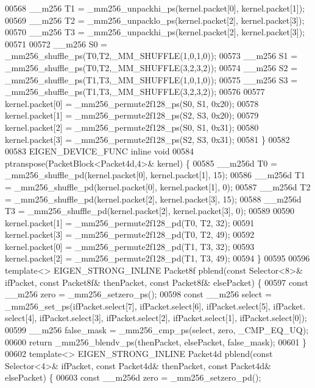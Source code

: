 \begin{DoxyCode}
{{00568   \_\_m256 T1 = \_mm256\_unpackhi\_ps(kernel.packet[0], kernel.packet[1]);
00569   \_\_m256 T2 = \_mm256\_unpacklo\_ps(kernel.packet[2], kernel.packet[3]);
00570   \_\_m256 T3 = \_mm256\_unpackhi\_ps(kernel.packet[2], kernel.packet[3]);
00571 
00572   \_\_m256 S0 = \_mm256\_shuffle\_ps(T0,T2,\_MM\_SHUFFLE(1,0,1,0));
00573   \_\_m256 S1 = \_mm256\_shuffle\_ps(T0,T2,\_MM\_SHUFFLE(3,2,3,2));
00574   \_\_m256 S2 = \_mm256\_shuffle\_ps(T1,T3,\_MM\_SHUFFLE(1,0,1,0));
00575   \_\_m256 S3 = \_mm256\_shuffle\_ps(T1,T3,\_MM\_SHUFFLE(3,2,3,2));
00576 
00577   kernel.packet[0] = \_mm256\_permute2f128\_ps(S0, S1, 0x20);
00578   kernel.packet[1] = \_mm256\_permute2f128\_ps(S2, S3, 0x20);
00579   kernel.packet[2] = \_mm256\_permute2f128\_ps(S0, S1, 0x31);
00580   kernel.packet[3] = \_mm256\_permute2f128\_ps(S2, S3, 0x31);
00581 \}
00582 
00583 EIGEN\_DEVICE\_FUNC \textcolor{keyword}{inline} \textcolor{keywordtype}{void}
00584 ptranspose(PacketBlock<Packet4d,4>& kernel) \{
00585   \_\_m256d T0 = \_mm256\_shuffle\_pd(kernel.packet[0], kernel.packet[1], 15);
00586   \_\_m256d T1 = \_mm256\_shuffle\_pd(kernel.packet[0], kernel.packet[1], 0);
00587   \_\_m256d T2 = \_mm256\_shuffle\_pd(kernel.packet[2], kernel.packet[3], 15);
00588   \_\_m256d T3 = \_mm256\_shuffle\_pd(kernel.packet[2], kernel.packet[3], 0);
00589 
00590   kernel.packet[1] = \_mm256\_permute2f128\_pd(T0, T2, 32);
00591   kernel.packet[3] = \_mm256\_permute2f128\_pd(T0, T2, 49);
00592   kernel.packet[0] = \_mm256\_permute2f128\_pd(T1, T3, 32);
00593   kernel.packet[2] = \_mm256\_permute2f128\_pd(T1, T3, 49);
00594 \}
00595 
00596 \textcolor{keyword}{template}<> EIGEN\_STRONG\_INLINE Packet8f pblend(\textcolor{keyword}{const} Selector<8>& ifPacket, \textcolor{keyword}{const} Packet8f& thenPacket, \textcolor{keyword}{
      const} Packet8f& elsePacket) \{
00597   \textcolor{keyword}{const} \_\_m256 zero = \_mm256\_setzero\_ps();
00598   \textcolor{keyword}{const} \_\_m256 select = \_mm256\_set\_ps(ifPacket.select[7], ifPacket.select[6], ifPacket.select[5], ifPacket.
      select[4], ifPacket.select[3], ifPacket.select[2], ifPacket.select[1], ifPacket.select[0]);
00599   \_\_m256 false\_mask = \_mm256\_cmp\_ps(select, zero, \_CMP\_EQ\_UQ);
00600   \textcolor{keywordflow}{return} \_mm256\_blendv\_ps(thenPacket, elsePacket, false\_mask);
00601 \}
00602 \textcolor{keyword}{template}<> EIGEN\_STRONG\_INLINE Packet4d pblend(\textcolor{keyword}{const} Selector<4>& ifPacket, \textcolor{keyword}{const} Packet4d& thenPacket, \textcolor{keyword}{
      const} Packet4d& elsePacket) \{
00603   \textcolor{keyword}{const} \_\_m256d zero = \_mm256\_setzero\_pd();
}}
\end{DoxyCode}
